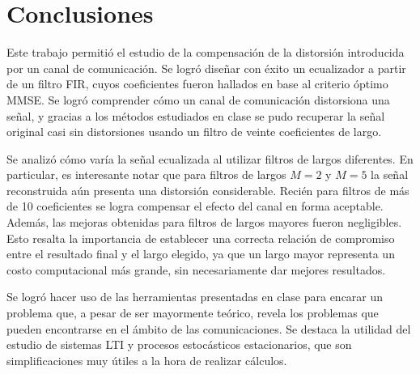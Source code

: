 \clearpage

\section{Conclusiones}

Este trabajo permitió el estudio de la compensación de la distorsión introducida por un canal de comunicación. Se logró diseñar con éxito un ecualizador a partir de un filtro FIR, cuyos coeficientes fueron hallados en base al criterio óptimo MMSE. Se logró comprender cómo un canal de comunicación distorsiona una señal, y gracias a los métodos estudiados en clase se pudo recuperar la señal original casi sin distorsiones usando un filtro de veinte coeficientes de largo.

Se analizó cómo varía la señal ecualizada al utilizar filtros de largos diferentes. En particular, es interesante notar que para filtros de largos $M = 2$ y $M = 5$ la señal reconstruida aún presenta una distorsión considerable. Recién para filtros de más de 10 coeficientes se logra compensar el efecto del canal en forma aceptable. Además, las mejoras obtenidas para filtros de largos mayores fueron negligibles. Esto resalta la importancia de establecer una correcta relación de compromiso entre el resultado final y el largo elegido, ya que un largo mayor representa un costo computacional más grande, sin necesariamente dar mejores resultados.

Se logró hacer uso de las herramientas presentadas en clase para encarar un problema que, a pesar de ser mayormente teórico, revela los problemas que pueden encontrarse en el ámbito de las comunicaciones. Se destaca la utilidad del estudio de sistemas LTI y procesos estocásticos estacionarios, que son simplificaciones muy útiles a la hora de realizar cálculos.
